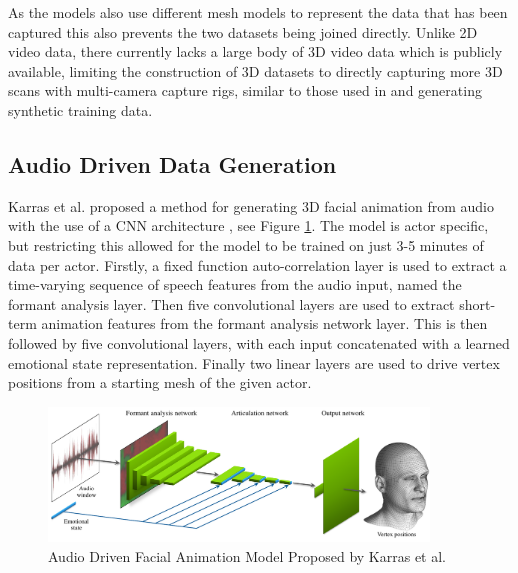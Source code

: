 As the models also use different mesh models to represent the data that has been captured this also prevents the two datasets being joined directly.
Unlike 2D video data, there currently lacks a large body of 3D video data which is publicly available, limiting the construction of 3D datasets to directly capturing more 3D scans with multi-camera capture rigs, similar to those used in \cite{Tzirakis2019, Cudeiro2019} and generating synthetic training data.

\subsection{Audio Driven Data Generation}
Karras et al. proposed a method for generating 3D facial animation from audio with the use of a CNN architecture \cite{Karras2017a}, see Figure \ref{fig:Karras_Model}.
The model is actor specific, but restricting this allowed for the model to be trained on just 3-5 minutes of data per actor.
Firstly, a fixed function auto-correlation layer is used to extract a time-varying sequence of speech features from the audio input, named the formant analysis layer.
Then five convolutional layers are used to extract short-term animation features from the formant analysis network layer.
This is then followed by five convolutional layers, with each input concatenated with a learned emotional state representation.
Finally two linear layers are used to drive vertex positions from a starting mesh of the given actor.

\begin{figure}[h]
    \centering
        \includegraphics[width=0.9\textwidth]{figures/karras_model.png}
    \caption{Audio Driven Facial Animation Model Proposed by Karras et al. \cite{Karras2017a}}\label{fig:Karras_Model}
\end{figure}

